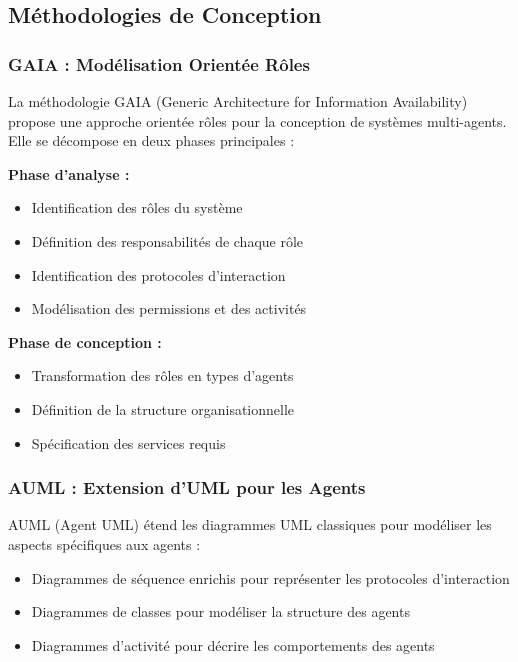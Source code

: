 \documentclass[12pt,a4paper]{article}
\begin{document}
\subsection{Méthodologies de Conception}

\subsubsection{GAIA : Modélisation Orientée Rôles}

La méthodologie GAIA (Generic Architecture for Information Availability) propose une approche orientée rôles pour la conception de systèmes multi-agents. Elle se décompose en deux phases principales :

\textbf{Phase d'analyse :}
\begin{itemize}[leftmargin=*]
    \item Identification des rôles du système
    \item Définition des responsabilités de chaque rôle
    \item Identification des protocoles d'interaction
    \item Modélisation des permissions et des activités
\end{itemize}

\textbf{Phase de conception :}
\begin{itemize}[leftmargin=*]
    \item Transformation des rôles en types d'agents
    \item Définition de la structure organisationnelle
    \item Spécification des services requis
\end{itemize}

\subsubsection{AUML : Extension d'UML pour les Agents}

AUML (Agent UML) étend les diagrammes UML classiques pour modéliser les aspects spécifiques aux agents :

\begin{itemize}[leftmargin=*]
    \item Diagrammes de séquence enrichis pour représenter les protocoles d'interaction
    \item Diagrammes de classes pour modéliser la structure des agents
    \item Diagrammes d'activité pour décrire les comportements des agents
\end{itemize}
\end{document}
